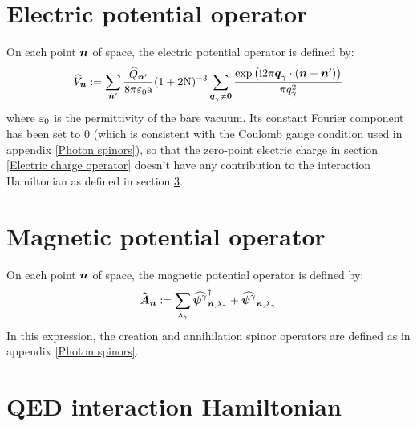 \documentclass[10pt,a4paper,twoside,openany]{book}
\begin{document}
\section{Electric potential operator}

On each point $\boldsymbol{n}$ of space, the electric potential operator is defined by:
\begin{equation*}
\widehat{V}_{\boldsymbol{n}} := \sum_{\boldsymbol{n}'} \frac{\widehat{Q}_{\boldsymbol{n}'}}{8 \pi \mathrm \varepsilon_0 \mathrm a} ( 1 + 2 \mathrm N )^{-3} \sum_{\boldsymbol{q}_\gamma \neq \boldsymbol{0}} \frac{\mathrm{exp} \left( {\mathrm{i} 2 \pi \boldsymbol{q}_\gamma \cdot ( \boldsymbol{n} - \boldsymbol{n}' )} \right)}{\pi q_\gamma^2}
\end{equation*}
where $\mathrm \varepsilon_0$ is the permittivity of the bare vacuum. Its constant Fourier component has been set to $0$ (which is consistent with the Coulomb gauge condition used in appendix \ref{Photon spinors}), so that the zero-point electric charge in section \ref{Electric charge operator} doesn't have any contribution to the interaction Hamiltonian as defined in section \ref{QED interaction Hamiltonian}.

\section{Magnetic potential operator}

On each point $\boldsymbol{n}$ of space, the magnetic potential operator is defined by:
\begin{equation*}
\widehat{\boldsymbol{A}}_{\boldsymbol{n}} := \sum_{\lambda_\gamma} \widehat{\boldsymbol{\psi}^{\gamma}}^{\dagger}_{{\boldsymbol{n}}, {\lambda_\gamma}} + \widehat{\boldsymbol{\psi}^{\gamma}}_{{\boldsymbol{n}}, {\lambda_\gamma}}
\end{equation*}
In this expression, the creation and annihilation spinor operators are defined as in appendix \ref{Photon spinors}.

\section{QED interaction Hamiltonian}
\label{QED interaction Hamiltonian}
\end{document}
